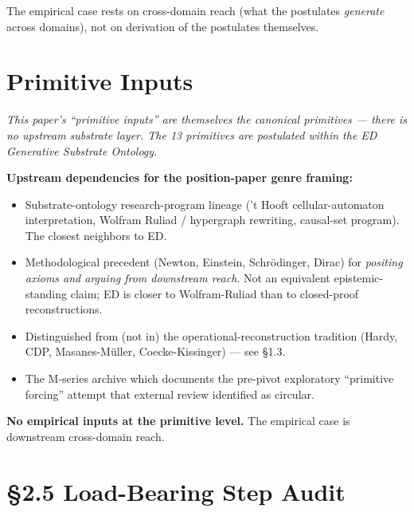 \documentclass[11pt,a4paper]{article}
\begin{document}
The empirical case rests on cross-domain reach (what the postulates \emph{generate} across domains), not on derivation of the postulates themselves.

\section{Primitive Inputs}

\emph{This paper's ``primitive inputs'' are themselves the canonical primitives --- there is no upstream substrate layer. The 13 primitives are postulated within the ED Generative Substrate Ontology.}

\textbf{Upstream dependencies for the position-paper genre framing:}

\begin{itemize}[noitemsep]
\item Substrate-ontology research-program lineage ('t Hooft cellular-automaton interpretation, Wolfram Ruliad / hypergraph rewriting, causal-set program). The closest neighbors to ED.
\item Methodological precedent (Newton, Einstein, Schr\"odinger, Dirac) for \emph{positing axioms and arguing from downstream reach}. Not an equivalent epistemic-standing claim; ED is closer to Wolfram-Ruliad than to closed-proof reconstructions.
\item Distinguished from (not in) the operational-reconstruction tradition (Hardy, CDP, Masanes-M\"uller, Coecke-Kissinger) --- see \S1.3.
\item The M-series archive which documents the pre-pivot exploratory ``primitive forcing'' attempt that external review identified as circular.
\end{itemize}

\textbf{No empirical inputs at the primitive level.} The empirical case is downstream cross-domain reach.

\section*{\S2.5 Load-Bearing Step Audit}
\end{document}
